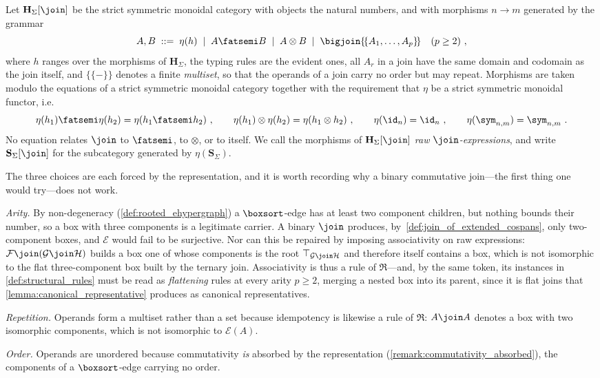 \begin{definition}\label{def:raw_join_expressions}
Let $\mathbf{H}_{\Sigma}[\join]$ be the strict symmetric monoidal category with objects
the natural numbers, and with morphisms $n \to m$ generated by the grammar
\[
A, B \;::=\; \eta(h) \;\mid\; A \fatsemi B \;\mid\; A \otimes B \;\mid\;
\bigjoin\{\!\{A_{1}, \ldots, A_{p}\}\!\}\quad (p \geq 2)~,
\]
where $h$ ranges over the morphisms of $\mathbf{H}_{\Sigma}$, the typing rules are the
evident ones, all $A_{r}$ in a join have the same domain and codomain as the join
itself, and $\{\!\{-\}\!\}$ denotes a finite \emph{multiset}, so that the operands of a
join carry no order but may repeat.
Morphisms are taken modulo the equations of a strict symmetric monoidal category
together with the requirement that $\eta$ be a strict symmetric monoidal functor, i.e.
\[
\eta(h_{1}) \fatsemi \eta(h_{2}) = \eta(h_{1} \fatsemi h_{2})~, \qquad
\eta(h_{1}) \otimes \eta(h_{2}) = \eta(h_{1} \otimes h_{2})~, \qquad
\eta(\id_{n}) = \id_{n}~, \qquad \eta(\sym_{n,m}) = \sym_{n,m}~.
\]
No equation relates $\join$ to $\fatsemi$, to $\otimes$, or to itself.
We call the morphisms of $\mathbf{H}_{\Sigma}[\join]$ \emph{raw
$\join$-expressions}, and write $\mathbf{S}_{\Sigma}[\join]$ for the subcategory
generated by $\eta(\mathbf{S}_{\Sigma})$.
\end{definition}

\begin{remark}\label{remark:join_arity}
The three choices are each forced by the representation, and it is worth recording why a
binary commutative join---the first thing one would try---does not work.

\emph{Arity.}
By non-degeneracy (\cref{def:rooted_ehypergraph}) a $\boxsort$-edge has at least two
component children, but nothing bounds their number, so a box with three components is a
legitimate carrier.
A binary $\join$ produces, by~\cref{def:join_of_extended_cospans}, only two-component
boxes, and $\mathcal{E}$ would fail to be surjective.
Nor can this be repaired by imposing associativity on raw expressions:
$\mathcal{F} \join (\mathcal{G} \join \mathcal{H})$ builds a box one of whose components is
the root $\top_{\mathcal{G} \join \mathcal{H}}$ and therefore itself contains a box, which
is not isomorphic to the flat three-component box built by the ternary join.
Associativity is thus a rule of $\mathfrak{R}$---and, by the same token, its instances in
\cref{def:structural_rules} must be read as \emph{flattening} rules at every arity
$p \geq 2$, merging a nested box into its parent, since it is flat joins that
\cref{lemma:canonical_representative} produces as canonical representatives.

\emph{Repetition.}
Operands form a multiset rather than a set because idempotency is likewise a rule of
$\mathfrak{R}$: $A \join A$ denotes a box with two isomorphic components, which is not
isomorphic to $\mathcal{E}(A)$.

\emph{Order.}
Operands are unordered because commutativity \emph{is} absorbed by the representation
(\cref{remark:commutativity_absorbed}), the components of a $\boxsort$-edge carrying no
order.
\end{remark}

